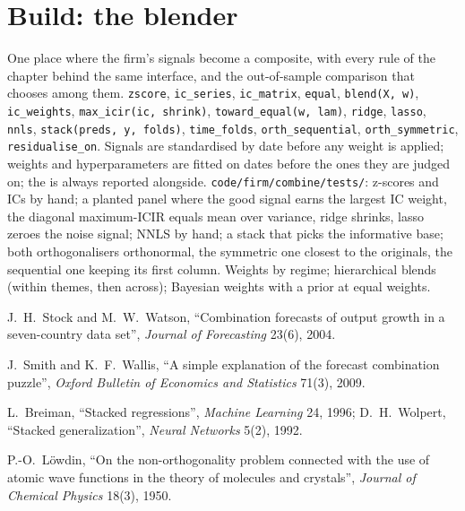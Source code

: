 \section{Build: the blender}\label{bld:rs:signal-combination:combine}

\begin{build}
 One place where the firm's signals become a composite, with every rule of the chapter behind the same interface, and the
out-of-sample comparison that chooses among them.
 \texttt{zscore}, \texttt{ic\_series}, \texttt{ic\_matrix}, \texttt{equal}, \texttt{blend(X, w)}, \texttt{ic\_weights},
\texttt{max\_icir(ic, shrink)}, \texttt{toward\_equal(w, lam)}, \texttt{ridge}, \texttt{lasso}, \texttt{nnls}, \texttt{stack(preds, y, folds)},
\texttt{time\_folds}, \texttt{orth\_sequential}, \texttt{orth\_symmetric}, \texttt{residualise\_on}.
 Signals are standardised by date before any weight is applied; weights and hyperparameters are fitted on dates before the ones they
are judged on; the  is always reported alongside.
 \texttt{code/firm/combine/tests/}: z-scores and ICs by hand; a planted panel where the good signal earns the largest IC weight,
the diagonal maximum-ICIR equals mean over variance, ridge shrinks, lasso zeroes the noise signal; NNLS by hand; a stack that picks the informative
base; both orthogonalisers orthonormal, the symmetric one closest to the originals, the sequential one keeping its first column.
 Weights by regime; hierarchical blends (within themes, then across); Bayesian weights with a prior at equal weights.
\end{build}

\begin{omsources}
\item J.~H.~Stock and M.~W.~Watson, ``Combination forecasts of output growth in a seven-country data set'', \emph{Journal of Forecasting}
23(6), 2004.
\item J.~Smith and K.~F.~Wallis, ``A simple explanation of the forecast combination puzzle'', \emph{Oxford Bulletin of Economics and Statistics}
71(3), 2009.
\item L.~Breiman, ``Stacked regressions'', \emph{Machine Learning} 24, 1996; D.~H.~Wolpert, ``Stacked generalization'', \emph{Neural Networks}
5(2), 1992.
\item P.-O.~Löwdin, ``On the non-orthogonality problem connected with the use of atomic wave functions in the theory of molecules and
crystals'', \emph{Journal of Chemical Physics} 18(3), 1950.
\end{omsources}

